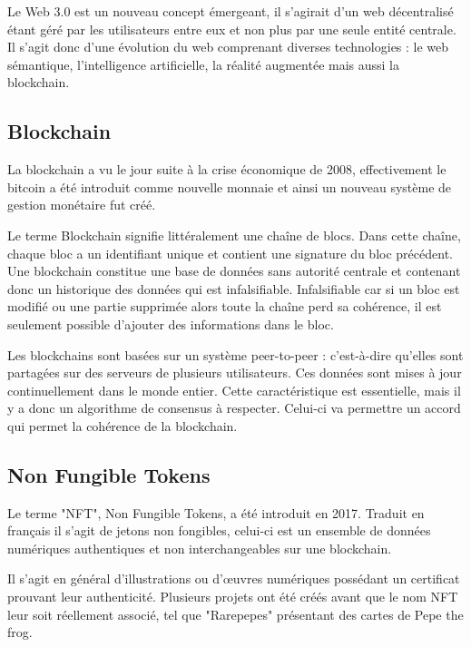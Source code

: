\documentclass[11pt]{article}
\begin{document}
Le Web 3.0 est un nouveau concept émergeant, il s'agirait d'un web décentralisé étant géré par les utilisateurs entre eux et non plus par une seule entité centrale. Il s'agit donc d'une évolution du web comprenant diverses technologies : le web sémantique, l'intelligence artificielle, la réalité augmentée mais aussi la blockchain. \cite{korpal_decentralization_2022} \cite{rudman_defining_2016}

\subsection{Blockchain} %
La blockchain a vu le jour suite à la crise économique de 2008, effectivement le bitcoin a été introduit comme nouvelle monnaie et ainsi un nouveau système de gestion monétaire fut créé. 

Le terme Blockchain signifie littéralement une chaîne de blocs. Dans cette chaîne, chaque bloc a un identifiant unique et contient une signature du bloc précédent. Une blockchain constitue une base de données sans autorité centrale et contenant donc un historique des données qui est infalsifiable. 
Infalsifiable car si un bloc est modifié ou une partie supprimée alors toute la chaîne perd sa cohérence, il est seulement possible d'ajouter des informations dans le bloc. \cite{dumas_1_2022} \cite{whitaker_art_2021}

Les blockchains sont basées sur un système peer-to-peer : c'est-à-dire qu'elles sont partagées sur des serveurs de plusieurs utilisateurs. Ces données sont mises à jour continuellement dans le monde entier. Cette caractéristique est essentielle, mais il y a donc un algorithme de consensus à respecter. Celui-ci va permettre un accord qui permet la cohérence de la blockchain. \cite{abbate_blockchain_2022}

\subsection{Non Fungible Tokens} %
Le terme "NFT", Non Fungible Tokens, a été introduit en 2017. Traduit en français il s'agit de jetons non fongibles, celui-ci est un ensemble de données numériques authentiques et non interchangeables sur une blockchain.  

Il s'agit en général d'illustrations ou d'œuvres  numériques possédant un certificat prouvant leur authenticité. Plusieurs projets ont été créés avant que le nom NFT leur soit réellement associé, tel que "Rarepepes" présentant des cartes de Pepe the frog.  
\end{document}
